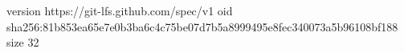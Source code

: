 version https://git-lfs.github.com/spec/v1
oid sha256:81b853ea65e7e0b3ba6c4c75be07d7b5a8999495e8fec340073a5b96108bf188
size 32
